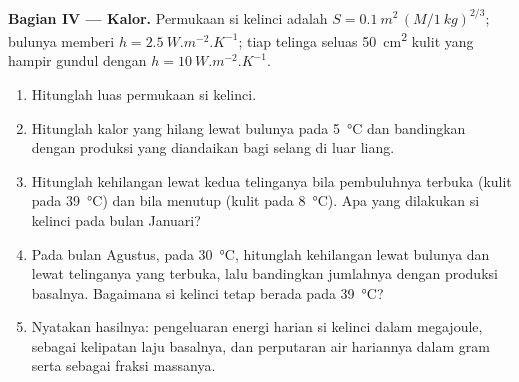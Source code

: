 \begin{problem}
\medskip
\noindent\textbf{Bagian IV --- Kalor.}
Permukaan si kelinci adalah $S = \qty{0.1}{m^2}\,(M/\qty{1}{kg})^{2/3}$;
bulunya memberi $h = \qty{2.5}{W.m^{-2}.K^{-1}}$; tiap telinga seluas
\qty{50}{cm^2} kulit yang hampir gundul dengan
$h = \qty{10}{W.m^{-2}.K^{-1}}$.
\begin{enumerate}[resume]
  \item Hitunglah luas permukaan si kelinci.
  \item Hitunglah kalor yang hilang lewat bulunya pada
        \qty{5}{\celsius} dan bandingkan dengan produksi yang
        diandaikan bagi selang di luar liang.
  \item Hitunglah kehilangan lewat kedua telinganya bila pembuluhnya
        terbuka (kulit pada \qty{39}{\celsius}) dan bila menutup (kulit
        pada \qty{8}{\celsius}). Apa yang dilakukan si kelinci pada
        bulan Januari?
  \item Pada bulan Agustus, pada \qty{30}{\celsius}, hitunglah
        kehilangan lewat bulunya dan lewat telinganya yang terbuka,
        lalu bandingkan jumlahnya dengan produksi basalnya. Bagaimana
        si kelinci tetap berada pada
        \qty{39}{\celsius}?
  \item Nyatakan hasilnya: pengeluaran energi harian si kelinci dalam
        megajoule, sebagai kelipatan laju basalnya, dan perputaran air
        hariannya dalam gram serta sebagai fraksi massanya.
\end{enumerate}
\end{problem}
